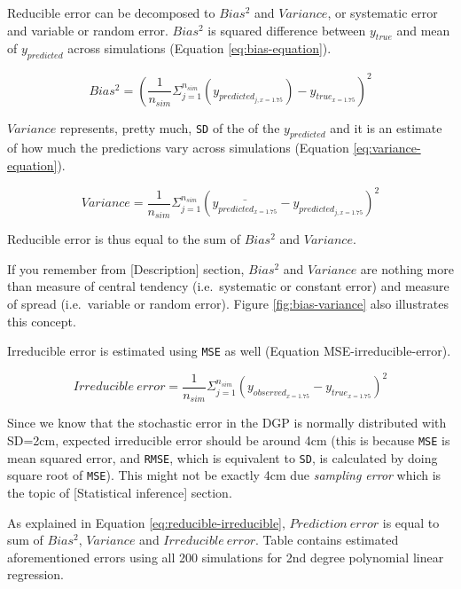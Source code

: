 \documentclass[
]{book}
\begin{document}
Reducible error can be decomposed to \(Bias^2\) and \(Variance\), or systematic error and variable or random error. \(Bias^2\) is squared difference between \(y_{true}\) and mean of \(y_{predicted}\) across simulations (Equation \eqref{eq:bias-equation}).

\begin{equation}
  Bias^2 = (\frac{1}{n_{sim}}\Sigma_{j=1}^{n_{sim}}(y_{predicted_{j, x=1.75}}) - y_{true_{x=1.75}})^2
  \label{eq:bias-equation}
\end{equation}

\(Variance\) represents, pretty much, \texttt{SD} of the of the \(y_{predicted}\) and it is an estimate of how much the predictions vary across simulations (Equation \eqref{eq:variance-equation}).

\begin{equation}
  Variance = \frac{1}{n_{sim}}\Sigma_{j=1}^{n_{sim}}(\bar{y_{predicted_{x=1.75}}} - y_{predicted_{j, x=1.75}})^2
  \label{eq:variance-equation}
\end{equation}

Reducible error is thus equal to the sum of \(Bias^2\) and \(Variance\).

If you remember from {[}Description{]} section, \(Bias^2\) and \(Variance\) are nothing more than measure of central tendency (i.e.~systematic or constant error) and measure of spread (i.e.~variable or random error). Figure \ref{fig:bias-variance} also illustrates this concept.

Irreducible error is estimated using \texttt{MSE} as well (Equation MSE-irreducible-error).

\begin{equation}
  Irreducible \: error = \frac{1}{n_{sim}}\Sigma_{j=1}^{n_{sim}}(y_{observed_{x=1.75}} - y_{true_{x=1.75}})^2
  \label{eq:MSE-irreducible-error}
\end{equation}

Since we know that the stochastic error in the DGP is normally distributed with SD=2cm, expected irreducible error should be around 4cm (this is because \texttt{MSE} is mean squared error, and \texttt{RMSE}, which is equivalent to \texttt{SD}, is calculated by doing square root of \texttt{MSE}). This might not be exactly 4cm due \emph{sampling error} which is the topic of {[}Statistical inference{]} section.

As explained in Equation \eqref{eq:reducible-irreducible}, \(Prediction \: error\) is equal to sum of \(Bias^2\), \(Variance\) and \(Irreducible \: error\). Table contains estimated aforementioned errors using all 200 simulations for 2nd degree polynomial linear regression.
\end{document}
